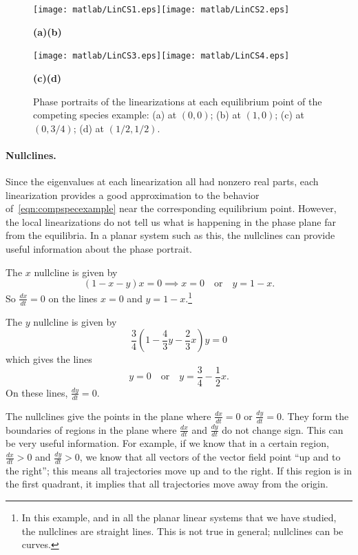 \documentclass[reqno]{immbook}
\begin{document}
\begin{figure}
\centerline{\texttt{[image: matlab/LinCS1.eps]}\texttt{[image: matlab/LinCS2.eps]}}
\vspace{-0.2in}
\centerline{\hspace{0.2in}\textbf{(a)}\hspace{2.1in}\textbf{(b)}}
\centerline{\texttt{[image: matlab/LinCS3.eps]}\texttt{[image: matlab/LinCS4.eps]}}
\vspace{-0.2in}
\centerline{\hspace{0.2in}\textbf{(c)}\hspace{2.1in}\textbf{(d)}}
\caption{Phase portraits of the linearizations at each equilibrium point
of the competing species example:
(a) at $(0,0)$; (b) at $(1,0)$; (c) at $(0,3/4)$; (d) at $(1/2,1/2)$.}
\label{fig:CompSpecLinPlots}
\end{figure}



\paragraph{Nullclines.}
Since the eigenvalues at each linearization
all had nonzero real parts, each linearization
provides a good approximation to the behavior
of~\eqref{eqn:compspecexample} near the corresponding
equilibrium point.
However, the local linearizations do not tell us what is
happening in the phase plane far from the equilibria.
In a planar system such as this, the nullclines
can provide useful information about the phase portrait.

The $x$ nullcline is given by
\begin{equation}
   (1-x-y)x = 0 \implies x=0 \quad\textrm{or}\quad y = 1-x.
\end{equation}
So $\frac{dx}{dt}=0$ on the lines $x=0$
and $y=1-x$.\footnote{In this example, and in all
the planar linear systems that we have studied,
the nullclines are straight lines. This is not true in general;
nullclines can be curves.}

The $y$ nullcline is given by
\begin{equation}
  \frac{3}{4}\left(1-\frac{4}{3}y - \frac{2}{3} x\right)y = 0
\end{equation}
which gives the lines
\begin{equation}
  y = 0 \quad \textrm{or} \quad y = \frac{3}{4} - \frac{1}{2}x.
\end{equation}
On these lines, $\frac{dy}{dt}=0$.

The nullclines give the points in the plane where 
$\frac{dx}{dt}=0$ or $\frac{dy}{dt}=0$.
They form the boundaries of regions in the plane
where $\frac{dx}{dt}$ and $\frac{dy}{dt}$ do not change sign.
This can be very useful information.
For example, if we know that in a certain region,
$\frac{dx}{dt} > 0$ and $\frac{dy}{dt}>0$, we know that all
vectors of the vector field point ``up and to the right'';
this means all trajectories move up and to the right.
If this region is in the first quadrant, it implies that
all trajectories move away from the origin.
\end{document}
